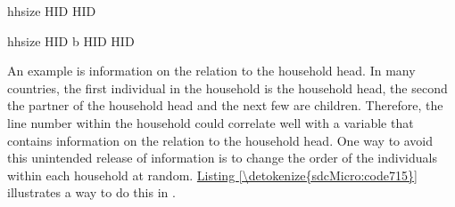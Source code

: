 \documentclass[letterpaper,10pt,english]{sphinxmanual}
\begin{document}
\def\sphinxLiteralBlockLabel{\label{\detokenize{sdcMicro:code714}}}
%
\begin{sphinxVerbatim}[commandchars=\\\{\},numbers=left,firstnumber=1,stepnumber=1]

     hhsize  HID
     HID


     hhsize     HID   b
        HID   HID  
\end{sphinxVerbatim}

 An example is information on the relation to the
household head. In many countries, the first individual in the household
is the household head, the second the partner of the household head and
the next few are children. Therefore, the line number within the
household could correlate well with a variable that contains information
on the relation to the household head. One way to avoid this unintended
release of information is to change the order of the individuals within
each household at random. \hyperref[\detokenize{sdcMicro:code715}]{Listing \ref{\detokenize{sdcMicro:code715}}} illustrates a way to do this in
.
\end{document}
